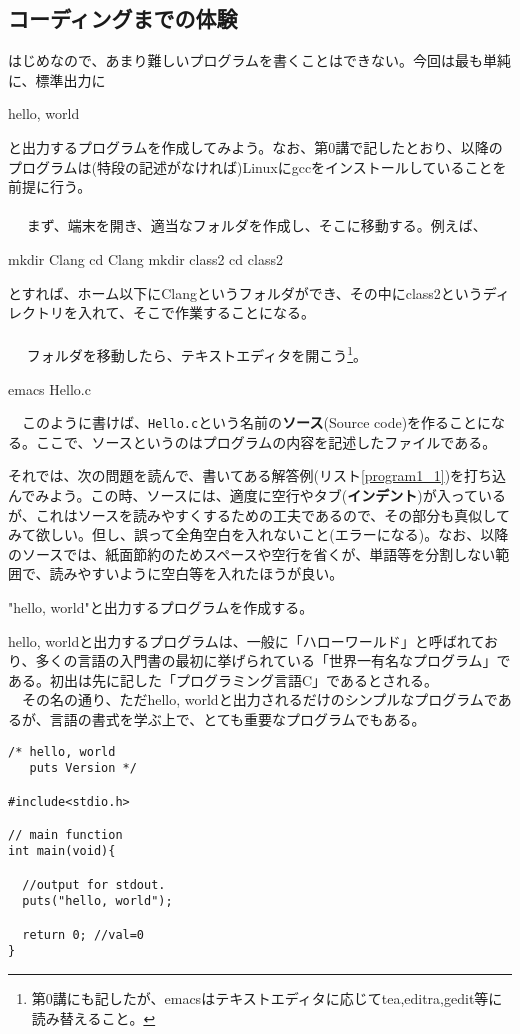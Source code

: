 \subsection{コーディングまでの体験}
はじめなので、あまり難しいプログラムを書くことはできない。今回は最も単純に、標準出力に
\begin{code}
hello, world
\end{code}
と出力するプログラムを作成してみよう。なお、第0講で記したとおり、以降のプログラムは(特段の記述がなければ)Linuxにgccをインストールしていることを前提に行う。
\\ \\　
まず、端末を開き、適当なフォルダを作成し、そこに移動する。例えば、
\begin{code}
mkdir Clang
cd Clang
mkdir class2
cd class2
\end{code}
とすれば、ホーム以下にClangというフォルダができ、その中にclass2というディレクトリを入れて、そこで作業することになる。
\\ \\　
フォルダを移動したら、テキストエディタを開こう\footnote{第0講にも記したが、emacsはテキストエディタに応じてtea,editra,gedit等に読み替えること。}。
\begin{code}
emacs Hello.c
\end{code}
　このように書けば、\verb|Hello.c|という名前の\textbf{ソース}(Source code)を作ることになる。ここで、ソースというのはプログラムの内容を記述したファイルである。

それでは、次の問題を読んで、書いてある解答例(リスト\ref{program1_1})を打ち込んでみよう。この時、ソースには、適度に空行やタブ(\textbf{インデント})が入っているが、これはソースを読みやすくするための工夫であるので、その部分も真似してみて欲しい。但し、誤って全角空白を入れないこと(エラーになる)。なお、以降のソースでは、紙面節約のためスペースや空行を省くが、単語等を分割しない範囲で、読みやすいように空白等を入れたほうが良い。
\begin{boxnote}
"hello, world"と出力するプログラムを作成する。
\begin{multicols}{2}
hello, worldと出力するプログラムは、一般に「ハローワールド」と呼ばれており、多くの言語の入門書の最初に挙げられている「世界一有名なプログラム」である。初出は先に記した「プログラミング言語C」であるとされる。\\
　その名の通り、ただhello, worldと出力されるだけのシンプルなプログラムであるが、言語の書式を学ぶ上で、とても重要なプログラムでもある。

\begin{lstlisting}[caption=ハローワールド,label=program1_1]
/* hello, world
   puts Version */

#include<stdio.h>

// main function
int main(void){

  //output for stdout.
  puts("hello, world");

  return 0; //val=0
}
\end{lstlisting}
\end{multicols}
\end{boxnote}

